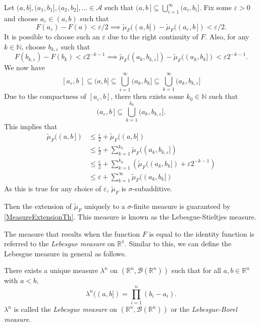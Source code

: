 \vspace{1mm}
Let $(a,b],(a_1,b_1],(a_2,b_2],\ldots\in\mathcal{A}$ such that $(a,b\,]\subseteq\bigcup_{i=1}^\infty (a_i, b_i]$. Fix some $\varepsilon>0$ and choose $a_\varepsilon\in(a,b)$ such that
$$F(a_\varepsilon)-F(a)< \varepsilon/2\implies \tilde\mu_F((a,b]) - \tilde\mu_F((a_\varepsilon,b\,]) < \varepsilon/2.$$
It is possible to choose such an $\varepsilon$ due to the right continuity of $F$. Also, for any $k\in\mathbb{N}$, choose $b_{k, \varepsilon}$ such that $$F(b_{k,\varepsilon})-F(b_k)<\varepsilon 2^{-k-1}\implies \tilde\mu_F((a_k,b_{k,\varepsilon}]) - \tilde\mu_F((a_k,b_k]) < \varepsilon 2^{-k-1}.$$
We now have
$$[a_\varepsilon, b\,]\subseteq (a,b]\subseteq \bigcup_{i=1}^\infty (a_k,b_k]\subseteq \bigcup_{k=1}^\infty (a_k,b_{k,\varepsilon}]$$
Due to the compactness of $[a_\varepsilon,b]$, there then exists some $k_0\in\mathbb{N}$ such that
$$(a_{\varepsilon},b\,]\subseteq\bigcup_{k=1}^{k_0}(a_k,b_{k,\varepsilon}].$$
This implies that
\begin{align*}
    \tilde\mu_F((a,b\,]) &\leq \frac{\varepsilon}{2} + \tilde\mu_F((a,b]) \\
    &\leq \frac{\varepsilon}{2} + \sum_{k=1}^{k_0} \tilde\mu_F((a_k,b_{k,\varepsilon}]) \\
    &\leq \frac{\varepsilon}{2} + \sum_{k=1}^{k_0} \left(\tilde\mu_F((a_k,b_k]) + \varepsilon2^{-k-1}\right) \\
    &\leq \varepsilon + \sum_{k=1}^{\infty} \tilde\mu_F((a_k,b_k])
\end{align*}
As this is true for any choice of $\varepsilon$, $\tilde\mu_F$ is $\sigma$-subadditive.

\vspace{2mm}
Then the extension of $\tilde\mu_F$ uniquely to a $\sigma$-finite measure is guaranteed by \cref{MeasureExtensionTh}. This measure is known as the Lebesgue-Stieltjes measure.

\vspace{2mm}
The measure that results when the function $F$ is equal to the identity function is referred to the \textit{Lebesgue measure} on $\mathbb{R}^1$. Similar to this, we can define the Lebesgue measure in general as follows.

\begin{definition}
    There exists a unique measure $\lambda^n$ on $(\mathbb{R}^n,\mathcal{B}(\mathbb{R}^n))$ such that for all $a,b\in\mathbb{R}^n$ with $a<b$,
    $$\lambda^n((a,b])=\prod_{i=1}^n (b_i-a_i).$$
    $\lambda^n$ is called the \textit{Lebesgue measure} on $(\mathbb{R}^n, \mathcal{B}(\mathbb{R}^n))$ or the \textit{Lebesgue-Borel measure}.
\end{definition}

